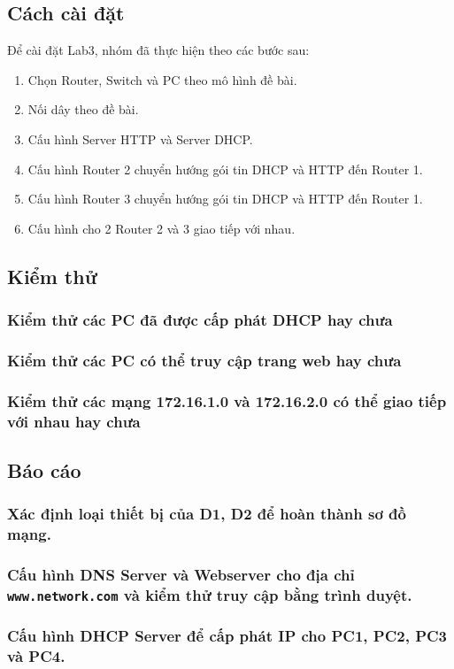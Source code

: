 \documentclass[]{article}
\begin{document}
\subsection{Cách cài đặt}
Để cài đặt Lab3, nhóm đã thực hiện theo các bước sau:
\begin{enumerate}
    \item Chọn Router, Switch và PC theo mô hình đề bài.
    \item Nối dây theo đề bài.
    \item Cấu hình Server HTTP và Server DHCP.
    \item Cấu hình Router 2 chuyển hướng gói tin DHCP và HTTP đến Router 1.
    \item Cấu hình Router 3 chuyển hướng gói tin DHCP và HTTP đến Router 1.
    \item Cấu hình cho 2 Router 2 và 3 giao tiếp với nhau.
\end{enumerate}
\subsection{Kiểm thử}
\subsubsection{Kiểm thử các PC đã được cấp phát DHCP hay chưa}
\subsubsection{Kiểm thử các PC có thể truy cập trang web hay chưa}
\subsubsection{Kiểm thử các mạng 172.16.1.0 và 172.16.2.0 có thể giao tiếp với nhau hay chưa}
\subsection{Báo cáo}
\subsubsection{Xác định loại thiết bị của D1, D2 để hoàn thành sơ đồ mạng.}
\subsubsection{Cấu hình DNS Server và Webserver cho địa chỉ \texttt{www.network.com} và kiểm thử truy cập bằng trình duyệt.}
\subsubsection{Cấu hình DHCP Server để cấp phát IP cho PC1, PC2, PC3 và PC4.}
\end{document}
